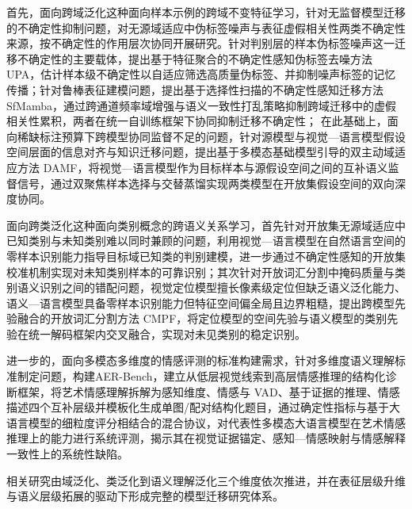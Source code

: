 首先，面向跨域泛化这种面向样本示例的跨域不变特征学习，针对无监督模型迁移的不确定性抑制问题，对无源域适应中伪标签噪声与表征虚假相关性两类不确定性来源，按不确定性的作用层次协同开展研究。针对判别层的样本伪标签噪声这一迁移不确定性的主要载体，提出基于特征聚合的不确定性感知伪标签去噪方法 UPA，估计样本级不确定性以自适应筛选高质量伪标签、并抑制噪声标签的记忆传播；针对鲁棒表征建模问题，提出基于选择性扫描的不确定性感知迁移方法 SfMamba，通过跨通道频率域增强与语义一致性打乱策略抑制跨域迁移中的虚假相关性累积，两者在统一自训练框架下协同抑制迁移不确定性；
在此基础上，面向稀缺标注预算下跨模型协同监督不足的问题，针对源模型与视觉—语言模型假设空间层面的信息对齐与知识迁移问题，提出基于多模态基础模型引导的双主动域适应方法 DAMF，将视觉—语言模型作为目标样本与源假设空间之间的互补语义监督信号，通过双聚焦样本选择与交替蒸馏实现两类模型在开放集假设空间的双向深度协同。

面向跨类泛化这种面向类别概念的跨语义关系学习，首先针对开放集无源域适应中已知类别与未知类别难以同时兼顾的问题，利用视觉—语言模型在自然语言空间的零样本识别能力指导目标域已知类的判别建模，进一步通过不确定性感知的开放集校准机制实现对未知类别样本的可靠识别；其次针对开放词汇分割中掩码质量与类别语义识别之间的错配问题，视觉定位模型擅长像素级定位但缺乏语义泛化能力、语义—语言模型具备零样本识别能力但特征空间偏全局且边界粗糙，提出跨模型先验融合的开放词汇分割方法 CMPF，将定位模型的空间先验与语义模型的类别先验在统一解码框架内交叉融合，实现对未见类别的稳定识别。

进一步的，面向多模态多维度的情感评测的标准构建需求，针对多维度语义理解标准制定问题，构建AER-Bench，建立从低层视觉线索到高层情感推理的结构化诊断框架，将艺术情感理解拆解为感知维度、情感与 VAD、基于证据的推理、情感描述四个互补层级并模板化生成单图/配对结构化题目，通过确定性指标与基于大语言模型的细粒度评分相结合的混合协议，对代表性多模态大语言模型在艺术情感推理上的能力进行系统评测，揭示其在视觉证据锚定、感知—情感映射与情感解释一致性上的系统性缺陷。

相关研究由域泛化、类泛化到语义理解泛化三个维度依次推进，并在表征层级升维与语义层级拓展的驱动下形成完整的模型迁移研究体系。
